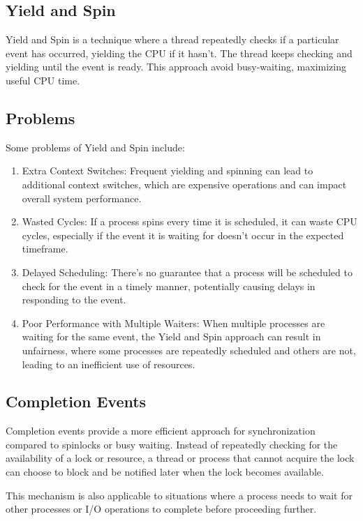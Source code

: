 \documentclass{report}
\begin{document}
\subsection{Yield and Spin}
Yield and Spin is a technique where a thread repeatedly checks if a particular event has
occurred, yielding the CPU if it hasn't. The thread keeps checking and yielding until the event is
ready. This approach avoid busy-waiting, maximizing useful CPU time.

\subsection*{Problems}
Some problems of Yield and Spin include: 

\begin{enumerate}[label=\textit{(\roman*)}]
\item Extra Context Switches: Frequent yielding and spinning can lead to additional context
  switches, which are expensive operations and can impact overall system performance.
\item Wasted Cycles: If a process spins every time it is scheduled, it can waste CPU cycles,
  especially if the event it is waiting for doesn't occur in the expected timeframe.
\item Delayed Scheduling: There's no guarantee that a process will be scheduled to check for the
  event in a timely manner, potentially causing delays in responding to the event.
\item Poor Performance with Multiple Waiters: When multiple processes are waiting for the same
  event, the Yield and Spin approach can result in unfairness, where some processes are repeatedly
  scheduled and others are not, leading to an inefficient use of resources.
\end{enumerate}


\subsection{Completion Events}
Completion events provide a more efficient approach for synchronization compared to spinlocks or
busy waiting. Instead of repeatedly checking for the availability of a lock or resource, a thread or
process that cannot acquire the lock can choose to block and be notified later when the lock becomes
available.

This mechanism is also applicable to situations where a process needs to wait for other
processes or I/O operations to complete before proceeding further.
\end{document}
